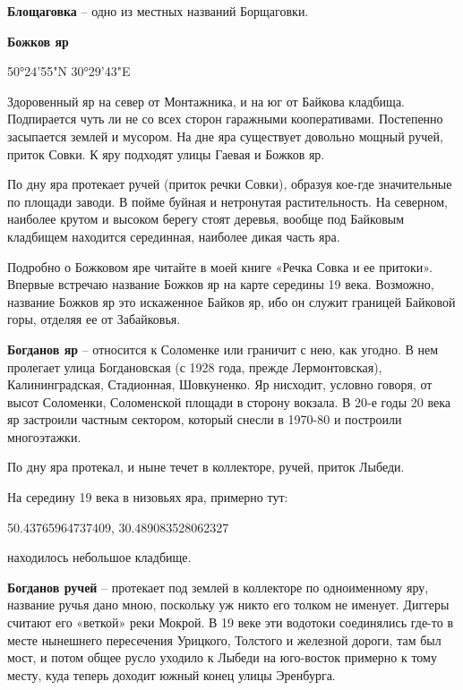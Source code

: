 \medskip

\textbf{Блощаговка} – одно из местных названий Борщаговки.\\

\medskip

\textbf{Божков яр} 

50°24'55"N 30°29'43"E

Здоровенный яр на север от Монтажника, и на юг от Байкова кладбища. Подпирается чуть ли не со всех сторон гаражными кооперативами. Постепенно засыпается землей и мусором. На дне яра существует довольно мощный ручей, приток Совки. К яру подходят улицы Гаевая и Божков яр. 

По дну яра протекает ручей (приток речки Совки), образуя кое-где значительные по площади заводи. В пойме буйная и нетронутая растительность. На северном, наиболее крутом и высоком берегу стоят деревья, вообще под Байковым кладбищем находится серединная, наиболее дикая часть яра.

Подробно о Божковом яре читайте в моей книге «Речка Совка и ее притоки». Впервые встречаю название Божков яр на карте середины 19 века. Возможно, название Божков яр это искаженное Байков яр, ибо он служит границей Байковой горы, отделяя ее от Забайковья.\\

\medskip

\textbf{Богданов яр} – относится к Соломенке или граничит с нею, как угодно. В нем пролегает улица Богдановская (с 1928 года, прежде Лермонтовская), Калининградская, Стадионная, Шовкуненко. Яр нисходит, условно говоря, от высот Соломенки, Соломенской площади в сторону вокзала. В 20-е годы 20 века яр застроили частным сектором, который снесли в 1970-80 и построили многоэтажки.

По дну яра протекал, и ныне течет в коллекторе, ручей, приток Лыбеди. 

На середину 19 века в низовьях яра, примерно тут:

50.43765964737409, 30.489083528062327

находилось небольшое кладбище.\\
\medskip

\textbf{Богданов ручей} – протекает под землей в коллекторе по одноименному яру, название ручья дано мною, поскольку уж никто его толком не именует. Диггеры считают его «веткой» реки Мокрой. В 19 веке эти водотоки соединялись где-то в месте нынешнего пересечения Урицкого, Толстого и железной дороги, там был мост, и потом общее русло уходило к Лыбеди на юго-восток примерно к тому месту, куда теперь доходит южный конец улицы Эренбурга.

